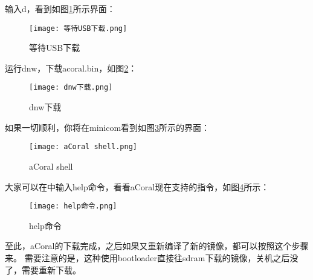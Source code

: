 输入d，看到如图\ref{等待USB下载}所示界面：
\begin{figure}[H]
	\texttt{[image: 等待USB下载.png]}
	\caption{等待USB下载}
	\label{等待USB下载}
\end{figure}

运行dnw，下载acoral.bin，如图\ref{dnw下载}：
\begin{figure}[H]
	\texttt{[image: dnw下载.png]}
	\caption{dnw下载}
	\label{dnw下载}
\end{figure}

如果一切顺利，你将在minicom看到如图\ref{aCoral shell}所示的界面：
\begin{figure}[H]
	\texttt{[image: aCoral shell.png]}
	\caption{aCoral shell}
	\label{aCoral shell}
\end{figure}

大家可以在中输入help命令，看看aCoral现在支持的指令，如图\ref{help命令}所示：
\begin{figure}[H]
	\texttt{[image: help命令.png]}
	\caption{help命令}
	\label{help命令}
\end{figure}

至此，aCoral的下载完成，之后如果又重新编译了新的镜像，都可以按照这个步骤来。
需要注意的是，这种使用bootloader直接往sdram下载的镜像，关机之后没了，需要重新下载。